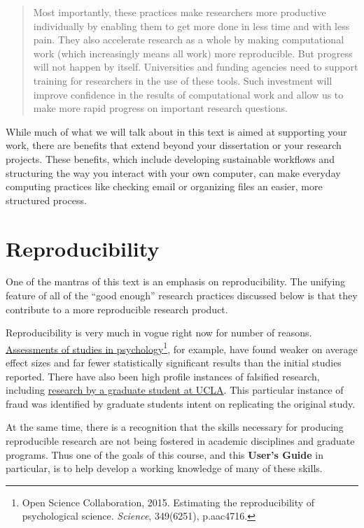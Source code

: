 \documentclass[]{book}
\let\rmarkdownfootnote\footnote%
\def\footnote{\protect\rmarkdownfootnote}
\theoremstyle{definition}
\theoremstyle{definition}
\theoremstyle{definition}
\theoremstyle{remark}
\begin{document}
\begin{quote}
Most importantly, these practices make researchers more productive
individually by enabling them to get more done in less time and with
less pain. They also accelerate research as a whole by making
computational work (which increasingly means all work) more
reproducible. But progress will not happen by itself. Universities and
funding agencies need to support training for researchers in the use of
these tools. Such investment will improve confidence in the results of
computational work and allow us to make more rapid progress on important
research questions.
\end{quote}

While much of what we will talk about in this text is aimed at
supporting your work, there are benefits that extend beyond your
dissertation or your research projects. These benefits, which include
developing sustainable workflows and structuring the way you interact
with your own computer, can make everyday computing practices like
checking email or organizing files an easier, more structured process.

\section{Reproducibility}\label{reproducibility}

One of the mantras of this text is an emphasis on reproducibility. The
unifying feature of all of the ``good enough'' research practices
discussed below is that they contribute to a more reproducible research
product.

Reproducibility is very much in vogue right now for number of reasons.
\href{http://science.sciencemag.org/content/349/6251/aac4716}{Assessments
of studies in psychology}\footnote{Open Science Collaboration, 2015.
  Estimating the reproducibility of psychological science.
  \emph{Science}, 349(6251), p.aac4716.}, for example, have found weaker
on average effect sizes and far fewer statistically significant results
than the initial studies reported. There have also been high profile
instances of falsified research, including
\href{http://nymag.com/scienceofus/2015/05/how-a-grad-student-uncovered-a-huge-fraud.html}{research
by a graduate student at UCLA}. This particular instance of fraud was
identified by graduate students intent on replicating the original
study.

At the same time, there is a recognition that the skills necessary for
producing reproducible research are not being fostered in academic
disciplines and graduate programs. Thus one of the goals of this course,
and this \textbf{User's Guide} in particular, is to help develop a
working knowledge of many of these skills.
\end{document}
